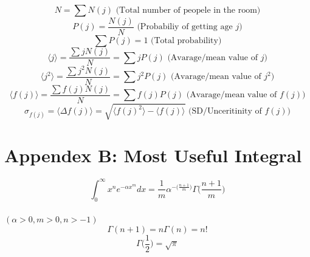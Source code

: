 \documentclass{article}[12pt, a4paper]
\newcommand{\gfrac}[2]{\frac{\displaystyle #1}{\displaystyle #2}}
\begin{document}
$$\boxed{N = \sum N(j)} \text{ (Total number of peopele in the room)}$$
$$\boxed{P(j) = \gfrac{N(j)}{N}} \text{ (Probabiliy of getting age $j$)}$$
$$\boxed{\sum P(j) = 1} \text{ (Total probability)}$$
$$\boxed{\langle j \rangle = \gfrac{\sum jN(j)}{N} = \sum j P(j)} \text{ (Avarage/mean value of $j$)}$$
$$\boxed{\langle j^2 \rangle = \gfrac{\sum j^2 N(j)}{N} = \sum j^2 P(j)} \text{ (Avarage/mean value of $j^2$)}$$
$$\boxed{\langle f(j) \rangle = \gfrac{\sum f(j) N(j)}{N} = \sum f(j) P(j)} \text{ (Avarage/mean value of $f(j)$)}$$
$$\boxed{\sigma_{f(j)} = \langle \Delta f(j) \rangle = \sqrt{\langle f(j)^2 \rangle - \langle f(j) \rangle}} \text{ (SD/Unceritinity of $f(j)$)}$$

\section*{Appendex B: Most Useful Integral}
$$\boxed{\int^{\infty}_0 x^n e^{\displaystyle -\alpha x^m} dx = \gfrac{1}{m} \alpha^{- \big(\gfrac{n+1}{m}\big)} \Gamma \big(\gfrac{n+1}{m}\big)}$$ \\
$(\alpha > 0, m > 0, n > -1)$
$$\boxed{\Gamma(n + 1) = n\Gamma(n) = n!}$$
$$\boxed{\Gamma\big(\gfrac{1}{2}\big) = \sqrt{\pi}}$$
\end{document}

